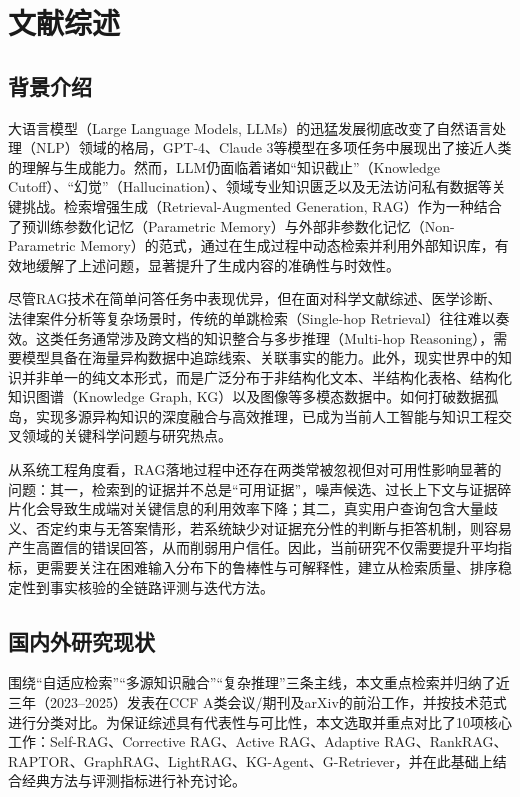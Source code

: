 \cleardoublepage
\newrefsection
\chapter{文献综述}

\section{背景介绍}
大语言模型（Large Language Models, LLMs）\cite{transformer, gpt3, llama}的迅猛发展彻底改变了自然语言处理（NLP）领域的格局，GPT-4\cite{gpt4}、Claude 3\cite{claude3}等模型在多项任务中展现出了接近人类的理解与生成能力。然而，LLM仍面临着诸如“知识截止”（Knowledge Cutoff）、“幻觉”（Hallucination）\cite{ref24}、领域专业知识匮乏以及无法访问私有数据等关键挑战。检索增强生成（Retrieval-Augmented Generation, RAG）\cite{ref1}作为一种结合了预训练参数化记忆（Parametric Memory）与外部非参数化记忆（Non-Parametric Memory）的范式，通过在生成过程中动态检索并利用外部知识库，有效地缓解了上述问题，显著提升了生成内容的准确性与时效性。

尽管RAG技术在简单问答任务中表现优异，但在面对科学文献综述、医学诊断、法律案件分析等复杂场景时，传统的单跳检索（Single-hop Retrieval）往往难以奏效。这类任务通常涉及跨文档的知识整合与多步推理（Multi-hop Reasoning），需要模型具备在海量异构数据中追踪线索、关联事实的能力。此外，现实世界中的知识并非单一的纯文本形式，而是广泛分布于非结构化文本、半结构化表格、结构化知识图谱（Knowledge Graph, KG）以及图像等多模态数据中。如何打破数据孤岛，实现多源异构知识的深度融合与高效推理，已成为当前人工智能与知识工程交叉领域的关键科学问题与研究热点。

从系统工程角度看，RAG落地过程中还存在两类常被忽视但对可用性影响显著的问题：其一，检索到的证据并不总是“可用证据”，噪声候选、过长上下文与证据碎片化会导致生成端对关键信息的利用效率下降；其二，真实用户查询包含大量歧义、否定约束与无答案情形，若系统缺少对证据充分性的判断与拒答机制，则容易产生高置信的错误回答，从而削弱用户信任。因此，当前研究不仅需要提升平均指标，更需要关注在困难输入分布下的鲁棒性与可解释性，建立从检索质量、排序稳定性到事实核验的全链路评测与迭代方法。

\section{国内外研究现状}

围绕“自适应检索”“多源知识融合”“复杂推理”三条主线，本文重点检索并归纳了近三年（2023--2025）发表在CCF A类会议/期刊及arXiv的前沿工作，并按技术范式进行分类对比。为保证综述具有代表性与可比性，本文选取并重点对比了10项核心工作：Self-RAG\cite{ref8}、Corrective RAG\cite{ref9}、Active RAG\cite{ref12}、Adaptive RAG\cite{ref11}、RankRAG\cite{ref10}、RAPTOR\cite{ref13}、GraphRAG\cite{ref15}、LightRAG\cite{ref16}、KG-Agent\cite{ref18}、G-Retriever\cite{ref33}，并在此基础上结合经典方法与评测指标进行补充讨论。

